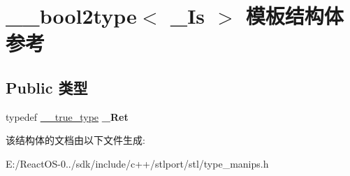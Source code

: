 \hypertarget{struct____bool2type}{}\section{\+\_\+\+\_\+bool2type$<$ \+\_\+\+Is $>$ 模板结构体 参考}
\label{struct____bool2type}
\subsection*{Public 类型}
\begin{DoxyCompactItemize}
\item 
\mbox{\label{struct____bool2type_a37e1e05e6592c37aa0b8104536122f0b}} 
typedef \hyperlink{struct____true__type}{\+\_\+\+\_\+true\+\_\+type} {\bfseries \+\_\+\+Ret}
\end{DoxyCompactItemize}


该结构体的文档由以下文件生成\+:\begin{DoxyCompactItemize}
\item 
E\+:/\+React\+O\+S-\/0../sdk/include/c++/stlport/stl/type\+\_\+manips.\+h\end{DoxyCompactItemize}
